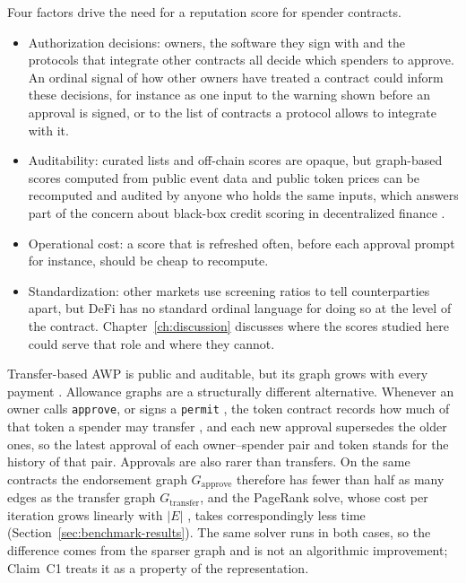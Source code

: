 Four factors drive the need for a reputation score for spender contracts.
\begin{itemize}
\item Authorization decisions: owners, the software they sign with and the protocols that integrate other contracts all decide which spenders to approve. An ordinal signal of how other owners have treated a contract could inform these decisions, for instance as one input to the warning shown before an approval is signed, or to the list of contracts a protocol allows to integrate with it.
\item Auditability: curated lists and off-chain scores are opaque, but graph-based scores computed from public event data and public token prices can be recomputed and audited by anyone who holds the same inputs, which answers part of the concern about black-box credit scoring in decentralized finance \parencite{packin2024credit}.
\item Operational cost: a score that is refreshed often, before each approval prompt for instance, should be cheap to recompute.
\item Standardization: other markets use screening ratios to tell counterparties apart, but DeFi has no standard ordinal language for doing so at the level of the contract. Chapter~\ref{ch:discussion} discusses where the scores studied here could serve that role and where they cannot.
\end{itemize}

Transfer-based AWP is public and auditable, but its graph grows with every payment \parencite{do2023awp}. Allowance graphs are a structurally different alternative. Whenever an owner calls \texttt{approve}, or signs a \texttt{permit} \parencite{lundfall2020permit}, the token contract records how much of that token a spender may transfer \parencite{vogelsteller2015erc20}, and each new approval supersedes the older ones, so the latest approval of each owner--spender pair and token stands for the history of that pair. Approvals are also rarer than transfers. On the same contracts the endorsement graph $G_{\text{approve}}$ therefore has fewer than half as many edges as the transfer graph $G_{\text{transfer}}$, and the PageRank solve, whose cost per iteration grows linearly with $|E|$ \parencite{leskovec2020mining}, takes correspondingly less time (Section~\ref{sec:benchmark-results}). The same solver runs in both cases, so the difference comes from the sparser graph and is not an algorithmic improvement; Claim~C1 treats it as a property of the representation.

